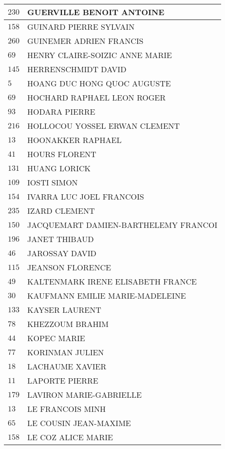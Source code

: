 \begin{xltabular}{\linewidth}{|l|X|}
    \hline
    $230$ & GUERVILLE BENOIT ANTOINE \\
    \hline
    $158$ & GUINARD PIERRE SYLVAIN \\
    \hline
    $260$ & GUINEMER ADRIEN FRANCIS \\
    \hline
    $69$ & HENRY CLAIRE-SOIZIC ANNE MARIE \\
    \hline
    $145$ & HERRENSCHMIDT DAVID \\
    \hline
    $5$ & HOANG DUC HONG QUOC AUGUSTE \\
    \hline
    $69$ & HOCHARD RAPHAEL LEON ROGER \\
    \hline
    $93$ & HODARA PIERRE \\
    \hline
    $216$ & HOLLOCOU YOSSEL ERWAN CLEMENT \\
    \hline
    $13$ & HOONAKKER RAPHAEL \\
    \hline
    $41$ & HOURS FLORENT \\
    \hline
    $131$ & HUANG LORICK \\
    \hline
    $109$ & IOSTI SIMON \\
    \hline
    $154$ & IVARRA LUC JOEL FRANCOIS \\
    \hline
    $235$ & IZARD CLEMENT \\
    \hline
    $150$ & JACQUEMART DAMIEN-BARTHELEMY FRANCOI \\
    \hline
    $196$ & JANET THIBAUD \\
    \hline
    $46$ & JAROSSAY DAVID \\
    \hline
    $115$ & JEANSON FLORENCE \\
    \hline
    $49$ & KALTENMARK IRENE ELISABETH FRANCE \\
    \hline
    $30$ & KAUFMANN EMILIE MARIE-MADELEINE \\
    \hline
    $133$ & KAYSER LAURENT \\
    \hline
    $78$ & KHEZZOUM BRAHIM \\
    \hline
    $44$ & KOPEC MARIE \\
    \hline
    $77$ & KORINMAN JULIEN \\
    \hline
    $18$ & LACHAUME XAVIER \\
    \hline
    $11$ & LAPORTE PIERRE \\
    \hline
    $179$ & LAVIRON MARIE-GABRIELLE \\
    \hline
    $13$ & LE FRANCOIS MINH \\
    \hline
    $65$ & LE COUSIN JEAN-MAXIME \\
    \hline
    $158$ & LE COZ ALICE MARIE \\

\end{xltabular}
